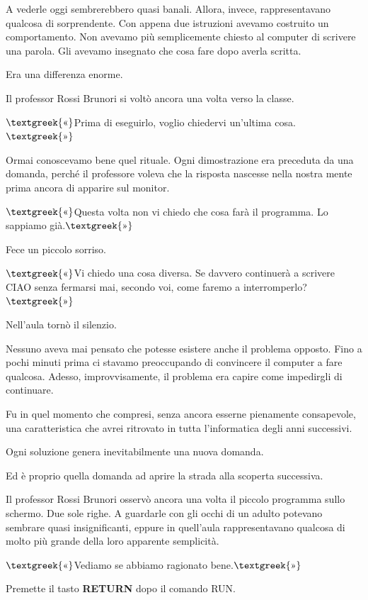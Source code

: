 \documentclass{article}
\begin{document}
A vederle oggi sembrerebbero quasi banali. Allora, invece, rappresentavano qualcosa di sorprendente. Con appena due
istruzioni avevamo costruito un comportamento. Non avevamo più semplicemente chiesto al computer di scrivere una
parola. Gli avevamo insegnato che cosa fare dopo averla scritta.

Era una differenza enorme.

Il professor Rossi Brunori si voltò ancora una volta verso la classe.

$\text{\textgreek{«}}$Prima di eseguirlo, voglio chiedervi un'ultima cosa.$\text{\textgreek{»}}$

Ormai conoscevamo bene quel rituale. Ogni dimostrazione era preceduta da una domanda, perché il professore voleva che la
risposta nascesse nella nostra mente prima ancora di apparire sul monitor.

$\text{\textgreek{«}}$Questa volta non vi chiedo che cosa farà il programma. Lo sappiamo già.$\text{\textgreek{»}}$

Fece un piccolo sorriso.

$\text{\textgreek{«}}$Vi chiedo una cosa diversa. Se davvero continuerà a scrivere {\textquotedbl}CIAO{\textquotedbl}
senza fermarsi mai, secondo voi, come faremo a interromperlo?$\text{\textgreek{»}}$

Nell'aula tornò il silenzio.

Nessuno aveva mai pensato che potesse esistere anche il problema opposto. Fino a pochi minuti prima ci stavamo
preoccupando di convincere il computer a fare qualcosa. Adesso, improvvisamente, il problema era capire come impedirgli
di continuare.

Fu in quel momento che compresi, senza ancora esserne pienamente consapevole, una caratteristica che avrei ritrovato in
tutta l'informatica degli anni successivi.

Ogni soluzione genera inevitabilmente una nuova domanda.

Ed è proprio quella domanda ad aprire la strada alla scoperta successiva.

Il professor Rossi Brunori osservò ancora una volta il piccolo programma sullo schermo. Due sole righe. A guardarle con
gli occhi di un adulto potevano sembrare quasi insignificanti, eppure in quell'aula rappresentavano qualcosa di molto
più grande della loro apparente semplicità.

$\text{\textgreek{«}}$Vediamo se abbiamo ragionato bene.$\text{\textgreek{»}}$

Premette il tasto \textbf{RETURN} dopo il comando RUN.
\end{document}
